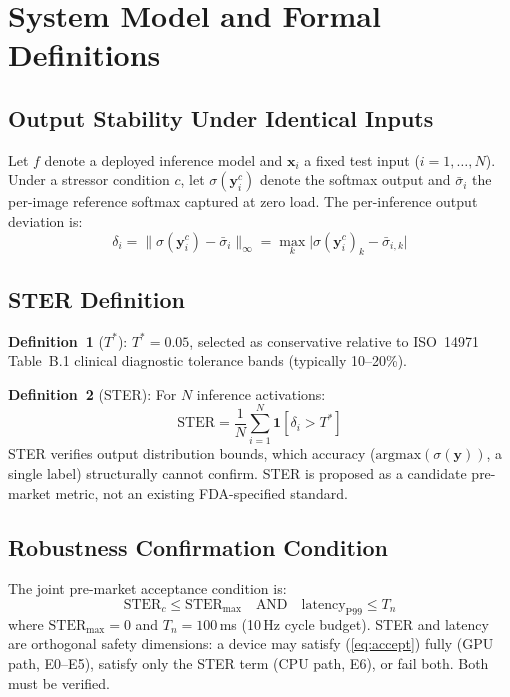 \documentclass[journal,10pt,twocolumn]{IEEEtran}
\begin{document}
\section{System Model and Formal Definitions}

\subsection{Output Stability Under Identical Inputs}

Let $f$ denote a deployed inference model and $\mathbf{x}_i$ a fixed
test input ($i = 1,\ldots,N$).
Under a stressor condition $c$, let $\sigma(\mathbf{y}_i^c)$ denote the
softmax output and $\bar{\sigma}_i$ the per-image reference softmax
captured at zero load.
The per-inference output deviation is:
\begin{equation}
  \delta_i = \bigl\|\sigma(\mathbf{y}_i^c) - \bar{\sigma}_i\bigr\|_\infty
           = \max_k \bigl|\sigma(\mathbf{y}_i^c)_k - \bar{\sigma}_{i,k}\bigr|
  \label{eq:delta}
\end{equation}

\subsection{STER Definition}

\textbf{Definition~1} ($T^*$): $T^* = 0.05$, selected as conservative
relative to ISO~14971 Table~B.1 clinical diagnostic tolerance bands
(typically 10--20\%).

\textbf{Definition~2} (STER): For $N$ inference activations:
\begin{equation}
  \mathrm{STER} = \frac{1}{N}\sum_{i=1}^{N}
    \mathbf{1}\!\left[\delta_i > T^*\right]
  \label{eq:ster}
\end{equation}
STER verifies output distribution bounds, which accuracy
($\mathrm{argmax}(\sigma(\mathbf{y}))$, a single label) structurally
cannot confirm.
STER is proposed as a candidate pre-market metric, not an existing
FDA-specified standard.

\subsection{Robustness Confirmation Condition}

The joint pre-market acceptance condition is:
\begin{equation}
  \mathrm{STER}_c \leq \mathrm{STER}_{\max}
  \quad\text{AND}\quad
  \mathrm{latency}_{\mathrm{P99}} \leq T_n
  \label{eq:accept}
\end{equation}
where $\mathrm{STER}_{\max} = 0$ and $T_n = 100$\,ms (10\,Hz cycle budget).
STER and latency are orthogonal safety dimensions: a device may satisfy
(\ref{eq:accept}) fully (GPU path, E0--E5), satisfy only the STER term
(CPU path, E6), or fail both. Both must be verified.
\end{document}
